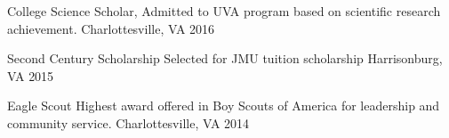 \begin{cvhonors}
  \cvhonor
    {College Science Scholar,} %
    {Admitted to UVA program based on scientific research achievement.} %
    {Charlottesville, VA} %
    {2016} %

  \cvhonor
    {Second Century Scholarship} %
    {Selected for JMU tuition scholarship} %
    {Harrisonburg, VA} %
    {2015} %
    
  \cvhonor
    {Eagle Scout} %
    {Highest award offered in Boy Scouts of America for leadership and community service.} %
    {Charlottesville, VA} %
    {2014} %


\end{cvhonors}








